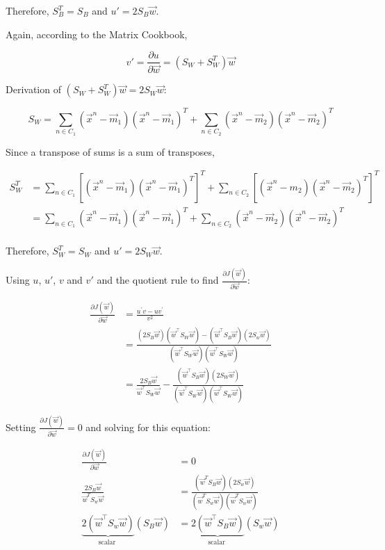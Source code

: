 \documentclass[12pt]{article}
\newcommand\w{\vec{w}}
\newcommand\msw{S_W}
\begin{document}
	Therefore, $S_B^T = S_B$ and $u'=2S_B \vec{w}$. 
	
	Again, according to the Matrix Cookbook, 
	
	$$v' = \frac{\partial u}{\partial \vec{w}} = (\msw + \msw^T) \w$$
	
	Derivation of $ (\msw + \msw^T) \w = 2\msw\w$:
	
	$$S_{W} = \sum_{n \in C_{1}}\left(\vec{x}^{n}-\vec{m}_{1}\right)\left(\vec{x}^{n}-\vec{m}_{1}\right)^{T}+
	\sum_{n \in C_{2}}\left(\vec{x}^{n}-\vec{m}_{2}\right)\left(\vec{x}^{n}-\vec{m}_{2}\right)^{T} $$
	
	Since a transpose of sums is a sum of transposes,
	
	$$
	\begin{aligned} 
	S_{W}^{T} 
	&=\sum_{n \in C_{1}}\left[\left(\vec{x}^{n}-\vec{m}_{1}\right)\left(\vec{x}^{n}-\vec{m}_{1}\right)^{T}\right]^{T}+
	\sum_{n \in C_{2}}\left[\left(\vec{x}^{n}-m_{2}\right)\left(\vec{x}^{n}-\vec{m}_{2}\right)^{T}\right]^{T} \\ 
	&= \sum_{n \in C_{1}}\left(\vec{x}^{n}-\vec{m}_{1}\right)\left(\vec{x}^{n}-\vec{m}_{1}\right)^{T}+
	\sum_{n \in C_{2}}\left(\vec{x}^{n}-\vec{m}_{2}\right)\left(\vec{x}^{n}-\vec{m}_{2}\right)^{T} \\
	\end{aligned}
	$$
	
	Therefore, $S_{W}^T = S_{W}$ and $u' = 2 S_W \vec{w}$.
		
	Using $u$, $u'$, $v$ and $v'$ and the quotient rule to find $\frac{\partial J(\vec{w})}{\partial \vec{w}}$:
	
	\begin{align}
	\frac{\partial J(\vec{w})}{\partial \vec{w}}
	&=\frac{u^{\prime} v-u v^{\prime}}{v^{2}} \\ 
	&=\frac{\left(2 S_{B} \vec{w}\right)\left(\vec{w}^{\top} S_W \vec{w}\right)-\left(\vec{w}^{\top} S_{B} \vec{w}\right)\left(2 S_{w} \vec{w}\right)}{\left(\vec{w}^{\top} S_{W} \vec{w}\right)\left(\vec{w}^{\top} S_{W} \vec{w}\right)} \\ 
	&=\frac{2 S_{B} \vec{w}}{\vec{w}^{\top} S_{W} \vec{w}}-\frac{\left(\vec{w}^{\top} S_{B} \vec{w}\right)\left(2 S_{W} \vec{w}\right)}{\left(\vec{w}^{\top} S_{W} \vec{w}\right)\left(\vec{w}^{\top} S_{W} \vec{w}\right)}
	\end{align}
	
	Setting $\frac{\partial J(\vec{w})}{\partial \vec{w}}=0$ and solving for this equation:
	
	\begin{align}
	\frac{\partial J(\vec{w})}{\partial \vec{w}}
	&=0 \\
	\frac{2 S_{B} \vec{w}}{\vec{w}^{T} S_{w} \vec{w}}
	&=\frac{\left(\vec{w}^{T} S_{B} \vec{w}\right)\left(2 S_{w} \vec{w}\right)}{\left(\vec{w}^{T} S_{w} \vec{w}\right)\left(\vec{w}^{T} S_{w} \vec{w}\right)} \\
	\underbrace{2\left(\vec{w}^{\top} S_{w} \vec{w}\right)}_{\text {scalar }} \left( S_{B} \vec{w}\right)
	&=\underbrace{2 \left(\vec{w}^{\top} S_{B} \vec{w}\right)}_{\text {scalar }} \left(S_{w} \vec{w}\right)
	\end{align}
	
\end{document}
